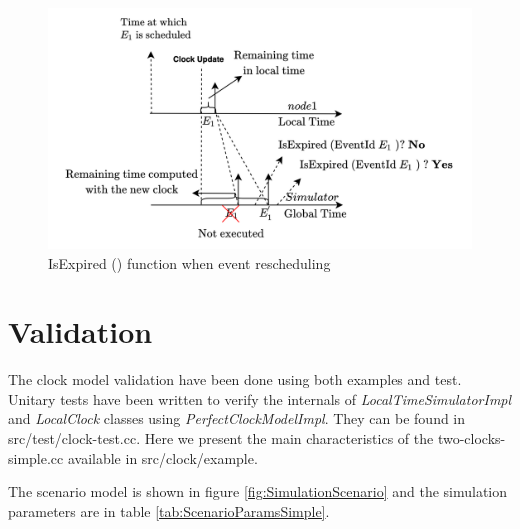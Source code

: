 \documentclass[times, twoside, watermark]{zHenriquesLab-StyleBioRxiv}
\begin{document}

\begin{figure}[h]
\centering
\includegraphics[width=\linewidth]{Figures/rescheduleExpired.png}
\caption{IsExpired () function when event rescheduling}
\label{fig:IsExpired}
\end{figure}

\section*{Validation}
The clock model validation have been done using both examples and test. Unitary tests have been written to verify the internals of \textit{LocalTimeSimulatorImpl} and \textit{LocalClock} classes using \textit{PerfectClockModelImpl}. They can be found in src/test/clock-test.cc.
Here we present the main characteristics of the two-clocks-simple.cc available in src/clock/example.

The scenario model is shown in figure \ref{fig:SimulationScenario} and the simulation parameters are in table \ref{tab:ScenarioParamsSimple}. 
\end{document}
